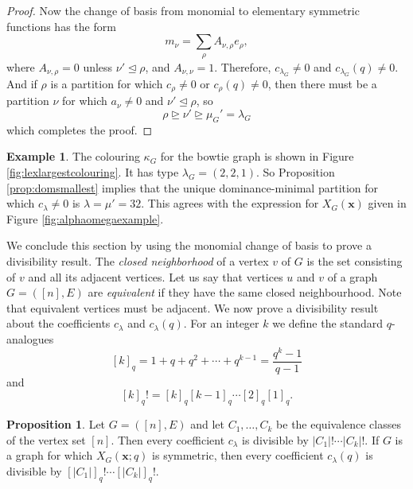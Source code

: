 \documentclass[12pt]{amsart}  %
\theoremstyle{definition}
\newtheorem{proposition}[theorem]{Proposition}
\newtheorem{example}[theorem]{Example}
\theoremstyle{remark}
\numberwithin{equation}{section}
\newcommand{\la}{\lambda}
\begin{document}
\begin{proof}
Now the change of basis from monomial to elementary symmetric functions has the form 
$$m_\nu=\sum_\rho A_{\nu,\rho}e_\rho,$$
where $A_{\nu,\rho}=0$ unless $\nu'\unlhd\rho$, and $A_{\nu,\nu}=1$. Therefore, $c_{\la_G}\neq 0$ and $c_{\la_G}(q)\neq 0$.  And if $\rho$ is a partition for which $c_\rho\neq 0$ or $c_\rho(q)\neq 0$, then there must be a partition $\nu$ for which $a_\nu\neq 0$ and $\nu'\unlhd\rho$, so 
$$\rho\unrhd\nu'\unrhd\mu_G'=\lambda_G
$$
which completes the proof.
\end{proof}



\begin{example}
The colouring $\kappa_G$  for the bowtie graph is shown in Figure \ref{fig:lexlargestcolouring}. It has type $\la_G=(2,2,1)$.  So Proposition \ref{prop:domsmallest} implies that the unique dominance-minimal partition for which $c_\lambda\neq 0$ is $\lambda=\mu'=32$. This agrees with the expression for $X_G(\bm x)$ given in Figure \ref{fig:alphaomegaexample}.
\end{example}

We conclude this section by using the monomial change of basis  to prove a divisibility result.
The {\em closed neighborhood} of a vertex $v$ of $G$ is the set consisting of $v$ and all its adjacent vertices.
Let us say that vertices $u$ and $v$ of a graph $G=([n],E)$ are \emph{equivalent} if they have the same closed neighbourhood. Note that equivalent vertices must be adjacent. We now prove a divisibility result about the coefficients $c_\lambda$ and $c_\lambda(q)$. For an integer $k$ we define the standard $q$-analogues
$$
[k]_q=1+q+q^2+\cdots+q^{k-1}=\frac{q^k-1}{q-1}
$$
and 
$$
[k]_q!=[k]_q[k-1]_q\cdots[2]_q[1]_q.
$$

\begin{proposition}
Let $G=([n],E)$ and let $C_1,\ldots,C_k$ be the equivalence classes of the vertex set $[n]$. Then every coefficient $c_\lambda$ is divisible by $|C_1|!\cdots|C_k|!$. If $G$ is a graph for which $X_G(\bm x;q)$ is symmetric, then every coefficient $c_\lambda(q)$ is divisible by $[|C_1|]_q!\cdots[|C_k|]_q!$.
\end{proposition}
\end{document}
